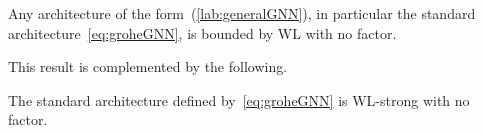 \begin{proposition}\label{prop:upperboundgeneral}
Any architecture of the form~(\ref{lab:generalGNN}), in particular the standard architecture~\eqref{eq:groheGNN}, is bounded by WL with no factor.
\end{proposition}

% 


This result is complemented by the following.
\begin{proposition}\label{prop:lowerboundgeneral}
The standard architecture defined by~\eqref{eq:groheGNN} is WL-strong with no factor.
\end{proposition}

